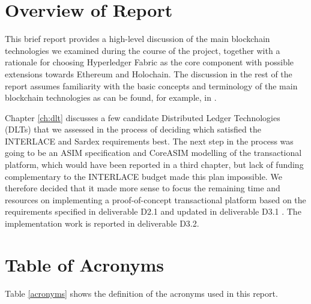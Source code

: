 \section{Overview of Report}
This brief report provides a high-level discussion of the main blockchain technologies we examined during the course of the project, together with a rationale for choosing Hyperledger Fabric as the core component with possible extensions towards Ethereum and Holochain. The discussion in the rest of the report assumes familiarity with the basic concepts and terminology of the main blockchain technologies as can be found, for example, in \cite{TascaEtAl2017}.

Chapter \ref{ch:dlt} discusses a few candidate Distributed Ledger Technologies (DLTs) that we assessed in the process of deciding which satisfied the INTERLACE and Sardex requirements best. The next step in the process was going to be an ASIM specification and CoreASIM modelling of the transactional platform, which would have been reported in a third chapter, but lack of funding complementary to the INTERLACE budget made this plan impossible. We therefore decided that it made more sense to focus the remaining time and resources on implementing a proof-of-concept transactional platform based on the requirements specified in deliverable D2.1 \cite{INTERLACE_D21} and updated in deliverable D3.1 \cite{INTERLACE_D31}. The implementation work is reported in deliverable D3.2.



\section{Table of Acronyms}
Table \ref{acronyms} shows the definition of the acronyms used in this report.


